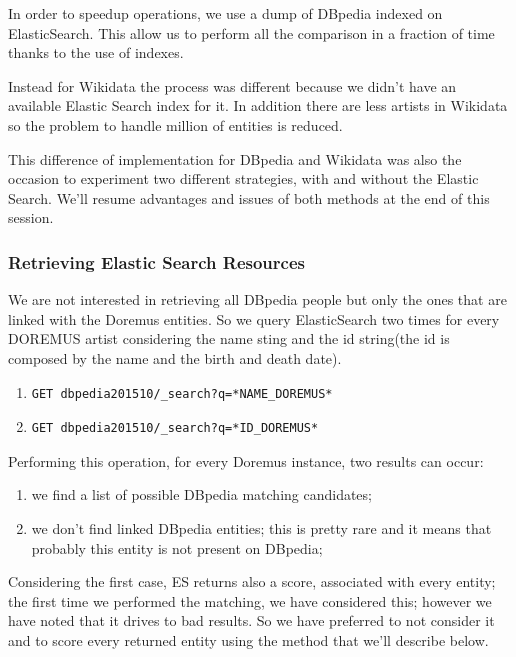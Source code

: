 \documentclass[paper=a4, fontsize=11pt]{scrartcl}
\begin{document}
In order to speedup operations, we use a dump of DBpedia indexed on ElasticSearch. This allow us to perform all the comparison in a fraction of time thanks to the use of indexes.

Instead for Wikidata the process was different because we didn't have an available Elastic Search index for it. In addition there are less artists in Wikidata so the problem to handle million of entities is reduced.

This difference of implementation for DBpedia and Wikidata was also the occasion to experiment two different strategies, with and without the Elastic Search. We'll resume advantages and issues of both methods at the end of this session.

\subsubsection{Retrieving Elastic Search Resources}
We are not interested in retrieving all DBpedia people but only the ones that are linked with the Doremus entities. So we query ElasticSearch two times for every DOREMUS artist considering the name sting and the id string(the id is composed by the name and the birth and death date).

\begin{enumerate}

\item \begin{verbatim}GET dbpedia201510/_search?q=*NAME_DOREMUS*\end{verbatim}
\item \begin{verbatim}GET dbpedia201510/_search?q=*ID_DOREMUS*\end{verbatim}

\end{enumerate}

Performing this operation, for every Doremus instance, two results can occur:

\begin{enumerate}
\item we find a list of possible DBpedia matching candidates;
\item we don't find linked DBpedia entities; this is pretty rare and it means that probably this entity is not present on DBpedia;
\end{enumerate}

Considering the first case, ES returns also a score, associated with every entity; the first time we performed the matching, we have considered this; however we have noted that it drives to bad results. So we have preferred to not consider it and to score every returned entity using the method that we'll describe below.
\end{document}
